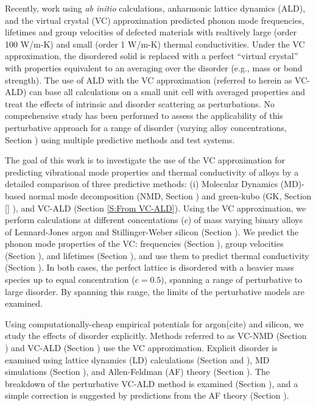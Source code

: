 \documentclass[aps,prb,twocolumn,superscriptaddress,amsmath,amssymb,floatfix]{revtex4}
\begin{document}
Recently, work using \emph{ab initio} calculations, anharmonic 
lattice dynamics (ALD), and the virtual crystal (VC) 
approximation predicted phonon mode frequencies, lifetimes and 
group velocities of defected materials with realtively
large (order 100 W/m-K\cite{garg_role_2011,lindsay_thermal_2012}) 
and 
small (order 1 W/m-K\cite{tian_phonon_2012}) 
thermal conductivities. 
Under the VC approximation, the disordered 
solid is replaced with a perfect “virtual crystal” with properties 
equivalent to an averaging over the disorder (e.g., mass or bond 
strength).\cite{abeles_lattice_1963}
The use of ALD with the VC approximation 
(referred to herein as VC-ALD) can base  
all calculations on a small unit cell with averaged properties and 
treat the effects of intrinsic and disorder scattering as perturbations.
\cite{abeles_lattice_1963,tamura_isotope_1983,
tian_phonon_2012,lindsay_thermal_2012} 
No comprehensive study has been performed 
to assess the applicability of this perturbative approach for a range 
of disorder (varying alloy concentrations, Section ) 
using multiple predictive methods and test systems.

The goal of this work is to investigate the use of the VC 
approximation for predicting vibrational mode properties and 
thermal conductivity of alloys by a detailed comparison 
of three predictive methods: (i) Molecular Dynamics (MD)-based 
normal mode 
decomposition (NMD, Section ) and green-kubo (GK, Section \ref{} ), 
and VC-ALD (Section \ref{S:From VC-ALD}). 
Using the VC approximation, 
we perform calculations at different concentations ($c$) 
of mass varying binary alloys of Lennard-Jones 
argon and Stillinger-Weber silicon (Section ). We predict 
the phonon mode properties of the VC:  
frequencies (Section ), group velocities (Section ),  
and lifetimes (Section ), and use them to predict thermal
conductivity (Section ). In both cases, the perfect lattice is 
disordered with a heavier mass species up to equal 
concentration ($c=0.5$), spanning 
a range of perturbative to large disorder. By spanning this range, 
the limits of the perturbative models are examined. 

Using computationally-cheap empirical potentials for argon(cite)  
and silicon\cite{stillinger_computer_1985},  
we study the effects of disorder explicitly. 
Methods referred to as VC-NMD (Section )
and VC-ALD (Section ) use the VC approximation. Explicit disorder 
is examined using lattice dynamics (LD) calculations 
(Section and ), MD simulations 
(Section ), and Allen-Feldman (AF) theory (Section ).
\cite{allen_thermal_1993} 
The breakdown of the perturbative VC-ALD method is examined 
(Section ), and a simple correction is suggested by predictions from 
the AF theory (Section ).
\end{document}
